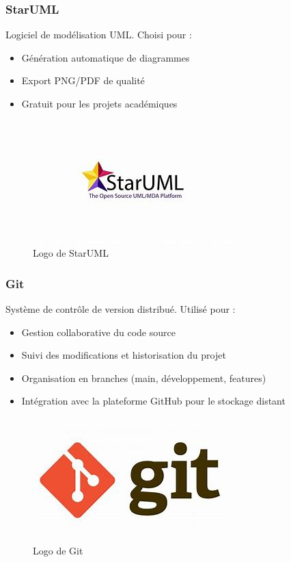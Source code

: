 \documentclass[12pt]{report}
\begin{document}
\subsubsection{StarUML}
Logiciel de modélisation UML. Choisi pour :
\begin{itemize}
    \item Génération automatique de diagrammes
    \item Export PNG/PDF de qualité
    \item Gratuit pour les projets académiques
\end{itemize}

\begin{figure}[H]
    \centering
    \includegraphics[width=0.7\linewidth]{./imgs/starumlLogo.jpg}
    \caption{Logo de StarUML}
    \label{fig:staruml}
\end{figure}

\subsubsection{Git}
Système de contrôle de version distribué. Utilisé pour :
\begin{itemize}
    \item Gestion collaborative du code source
    \item Suivi des modifications et historisation du projet
    \item Organisation en branches (main, développement, features)
    \item Intégration avec la plateforme GitHub pour le stockage distant
\end{itemize}

\begin{figure}[H]
    \centering
    \includegraphics[width=0.4\linewidth]{./imgs/gitLogo.jpg}
    \caption{Logo de Git}
    \label{fig:git}
\end{figure}
\end{document}
